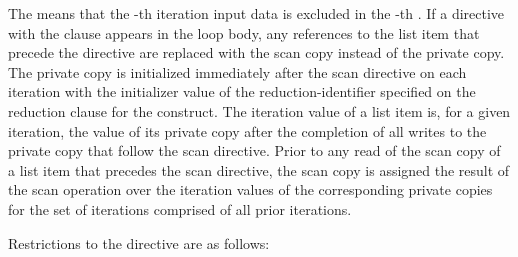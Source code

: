 
The  means that the -th iteration input data is 
excluded in the -th .
If a  directive with the  clause appears in the loop
body, any references to the list item that precede the directive
are replaced with the scan copy instead of the private copy. The
private copy is initialized immediately after the scan directive
on each iteration with the initializer value of the
reduction-identifier specified on the reduction clause for the
construct. The iteration value of a list item is, for a given
iteration, the value of its private copy after the completion of
all writes to the private copy that follow the scan directive.
Prior to any read of the scan copy of a list item that precedes
the scan directive, the scan copy is assigned the result of the
scan operation over the iteration values of the corresponding
private copies for the set of iterations comprised of all prior
iterations.


\restrictions
Restrictions to the  directive are as follows:

